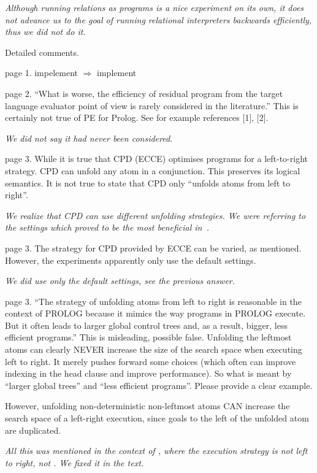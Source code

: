 \emph{Although running \mk relations as \pro programs is a nice experiment on its own, it does not advance us to the goal of running relational interpreters backwards efficiently, thus we did not do it.}

Detailed comments.

page 1. impelement $\Rightarrow$ implement

page 2.  ``What is worse, the efficiency of residual program from the target language evaluator point of view is rarely considered in the literature.'' This is certainly not true of PE for Prolog.  See for example references [1], [2].

\emph{We did not say it had never been considered.}

page 3.  While it is true that CPD (ECCE) optimises programs for a left-to-right strategy. CPD can unfold any atom in a conjunction.  This preserves its logical semantics.  It is not true to state that CPD only ``unfolds atoms from left to right''.

\emph{We realize that CPD can use different unfolding strategies. We were referring to the settings which proved to be the most beneficial in~\cite{leuschel1997advanced}.}

page 3.  The strategy for CPD provided by ECCE can be varied, as mentioned.  However, the experiments apparently only use the default settings.

\emph{We did use only the default settings, see the previous answer.}

page 3. ``The strategy of unfolding atoms from left to right is reasonable in the context of PROLOG because it mimics the way programs in PROLOG execute. But it often leads to larger global control trees and, as a result, bigger, less efficient programs.''  This is misleading, possible false.  Unfolding the leftmost atoms can clearly NEVER increase the size of the search space when executing left to right.  It merely pushes forward some choices (which often can improve indexing in the head clause and improve performance). So what is meant by ``larger global trees'' and ``less efficient programs''. Please provide a clear example.

However, unfolding non-deterministic non-leftmost atoms CAN increase the search space of a left-right execution, since goals to the left of the unfolded atom are duplicated.

\emph{All this was mentioned in the context of \mk, where the execution strategy is not left to right, not \pro. We fixed it in the text.}


